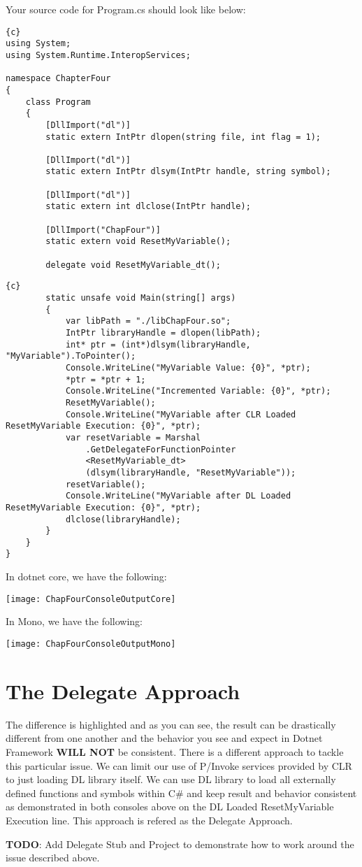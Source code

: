 \newpage
Your source code for Program.cs should look like below:
\begin{lstlisting}{c}
using System;
using System.Runtime.InteropServices;

namespace ChapterFour
{
	class Program
	{
		[DllImport("dl")]
		static extern IntPtr dlopen(string file, int flag = 1);
		
		[DllImport("dl")]
		static extern IntPtr dlsym(IntPtr handle, string symbol);
		
		[DllImport("dl")]
		static extern int dlclose(IntPtr handle);
		
		[DllImport("ChapFour")]
		static extern void ResetMyVariable();
		
		delegate void ResetMyVariable_dt();
\end{lstlisting}
\newpage
\begin{lstlisting}{c}
		static unsafe void Main(string[] args)
		{
			var libPath = "./libChapFour.so";
			IntPtr libraryHandle = dlopen(libPath);
			int* ptr = (int*)dlsym(libraryHandle, "MyVariable").ToPointer();
			Console.WriteLine("MyVariable Value: {0}", *ptr);
			*ptr = *ptr + 1;
			Console.WriteLine("Incremented Variable: {0}", *ptr);
			ResetMyVariable();
			Console.WriteLine("MyVariable after CLR Loaded ResetMyVariable Execution: {0}", *ptr);
			var resetVariable = Marshal
				.GetDelegateForFunctionPointer
				<ResetMyVariable_dt>
				(dlsym(libraryHandle, "ResetMyVariable"));
			resetVariable();
			Console.WriteLine("MyVariable after DL Loaded ResetMyVariable Execution: {0}", *ptr);
			dlclose(libraryHandle);
		}
	}
}
\end{lstlisting}
\newpage
In dotnet core, we have the following:

\texttt{[image: ChapFourConsoleOutputCore]}

In Mono, we have the following:

\texttt{[image: ChapFourConsoleOutputMono]}
\newpage
\section{The Delegate Approach}
The difference is highlighted and as you can see, the result can be drastically different from one another and the behavior you see and expect in Dotnet Framework \textbf{WILL NOT} be consistent.
There is a different approach to tackle this particular issue.
We can limit our use of P/Invoke services provided by CLR to just loading DL library itself.
We can use DL library to load all externally defined functions and symbols within C\# and keep result and behavior consistent as demonstrated in both consoles above on the DL Loaded ResetMyVariable Execution line.
This approach is refered as the Delegate Approach.

\textbf{TODO}: Add Delegate Stub and Project to demonstrate how to work around the issue described above.